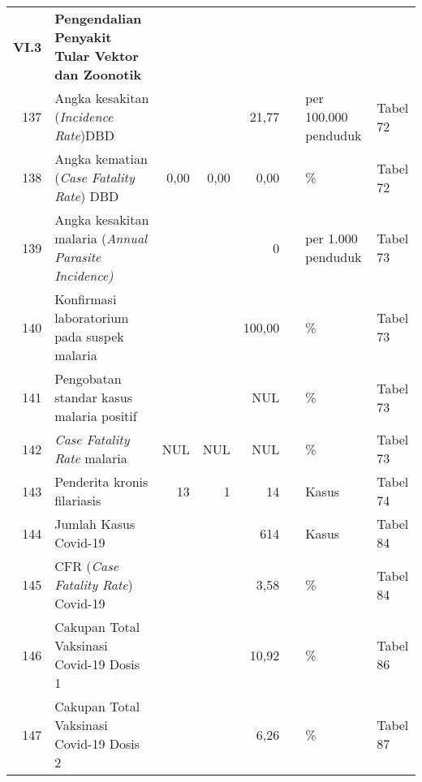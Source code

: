 \begin{small}
\begin{longtable}{rY{12em}rrrrY{5em}Y{5em}}
	\textbf{VI.3} & \textbf{Pengendalian Penyakit Tular Vektor dan Zoonotik}          &        &        &                    &          &                                &          \\
	137 & Angka kesakitan (\emph{Incidence Rate})DBD                                  &        &        &              21,77 &          & per 100.000 penduduk           & Tabel 72 \\
	138 & Angka kematian (\emph{Case Fatality Rate}) DBD                              &   0,00 &   0,00 &               0,00 &          & \%                             & Tabel 72 \\
	139 & Angka kesakitan malaria (\emph{Annual Parasite Incidence)}                  &        &        &                  0 &          & per 1.000 penduduk             & Tabel 73 \\
	140 & Konfirmasi laboratorium pada suspek malaria                                 &        &        &             100,00 &          & \%                             & Tabel 73 \\
	141 & Pengobatan standar kasus malaria positif                                    &        &        &                NUL &          & \%                             & Tabel 73 \\
	142 & \emph{Case Fatality Rate} malaria                                           &    NUL &    NUL &                NUL &          & \%                             & Tabel 73 \\
	143 & Penderita kronis filariasis                                                 &     13 &      1 &                 14 &          & Kasus                          & Tabel 74 \\
	144 & Jumlah Kasus Covid-19                                                       &        &        &                614 &          & Kasus                          & Tabel 84 \\
	145 & CFR (\emph{Case Fatality Rate}) Covid-19                                    &        &        &               3,58 &          & \%                             & Tabel 84 \\
	146 & Cakupan Total Vaksinasi Covid-19 Dosis 1                                    &        &        &              10,92 &          & \%                             & Tabel 86 \\
	147 & Cakupan Total Vaksinasi Covid-19 Dosis 2                                    &        &        &               6,26 &          & \%                             & Tabel 87 \\

\end{longtable}
\end{small}
